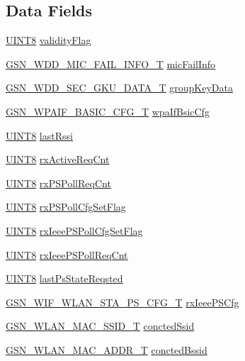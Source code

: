\subsection*{Data Fields}
\begin{DoxyCompactItemize}
\item 
\hyperlink{a00660_gab27e9918b538ce9d8ca692479b375b6a}{UINT8} \hyperlink{a00282_a816407436e0034386b9105d7a178503c}{validityFlag}
\item 
\hyperlink{a00278}{GSN\_\-WDD\_\-MIC\_\-FAIL\_\-INFO\_\-T} \hyperlink{a00282_ac30e33b6d4676a7edce742595bc2132a}{micFailInfo}
\item 
\hyperlink{a00291}{GSN\_\-WDD\_\-SEC\_\-GKU\_\-DATA\_\-T} \hyperlink{a00282_a80250fb031ce539c4d61c3af0fb90b98}{groupKeyData}
\item 
\hyperlink{a00420}{GSN\_\-WPAIF\_\-BASIC\_\-CFG\_\-T} \hyperlink{a00282_ab7ebd92c07a37e5734d4a013a626c921}{wpaIfBsicCfg}
\item 
\hyperlink{a00660_gab27e9918b538ce9d8ca692479b375b6a}{UINT8} \hyperlink{a00282_ab51ac124f098a070cec5bf8c41f50af9}{lastRssi}
\item 
\hyperlink{a00660_gab27e9918b538ce9d8ca692479b375b6a}{UINT8} \hyperlink{a00282_a125a8eaa4e3d225ee2ef6a97c49b1623}{rxActiveReqCnt}
\item 
\hyperlink{a00660_gab27e9918b538ce9d8ca692479b375b6a}{UINT8} \hyperlink{a00282_ae1c83e85aa9154a9e18cc1c67b25eceb}{rxPSPollReqCnt}
\item 
\hyperlink{a00660_gab27e9918b538ce9d8ca692479b375b6a}{UINT8} \hyperlink{a00282_a95f3bbf9ee9798a1df6a44a639127d06}{rxPSPollCfgSetFlag}
\item 
\hyperlink{a00660_gab27e9918b538ce9d8ca692479b375b6a}{UINT8} \hyperlink{a00282_a0a22ab1c8db99c09340bf3a95b81095e}{rxIeeePSPollCfgSetFlag}
\item 
\hyperlink{a00660_gab27e9918b538ce9d8ca692479b375b6a}{UINT8} \hyperlink{a00282_a3b37e1014c34c7ae4be0ee648aa3be61}{rxIeeePSPollReqCnt}
\item 
\hyperlink{a00660_gab27e9918b538ce9d8ca692479b375b6a}{UINT8} \hyperlink{a00282_a0a4ec0bdbd4cdf3511df5e31f1b8eeed}{lastPsStateReqsted}
\item 
\hyperlink{a00403}{GSN\_\-WIF\_\-WLAN\_\-STA\_\-PS\_\-CFG\_\-T} \hyperlink{a00282_a5a308a3717827f3646911070ac15edb3}{rxIeeePSCfg}
\item 
\hyperlink{a00417}{GSN\_\-WLAN\_\-MAC\_\-SSID\_\-T} \hyperlink{a00282_ad6372ee4a4f4b10d14ac0b82ebefb1c8}{conctedSsid}
\item 
\hyperlink{a00416}{GSN\_\-WLAN\_\-MAC\_\-ADDR\_\-T} \hyperlink{a00282_ab56e7a67403a851a38b9d031d7417ffd}{conctedBssid}
\end{DoxyCompactItemize}


